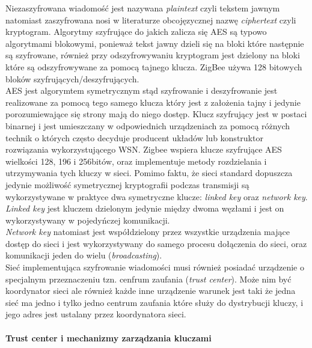 Niezaszyfrowana wiadomość jest nazywana \textit{plaintext} czyli tekstem jawnym natomiast zaszyfrowana nosi w literaturze obcojęzycznej nazwę \textit{ciphertext} czyli kryptogram. Algorytmy szyfrujące do jakich zalicza się AES są typowo algorytmami blokowymi, ponieważ tekst jawny dzieli się na bloki które następnie są szyfrowane, również przy odszyfrowywaniu kryptogram jest dzielony na bloki które są odszyfrowywane za pomocą tajnego klucza. ZigBee używa 128 bitowych bloków szyfrujących/deszyfrujących. \\
AES jest algorymtem symetrycznym stąd szyfrowanie i deszyfrowanie jest realizowane za pomocą tego samego klucza który jest z założenia tajny i jedynie porozumiewające się strony mają do niego dostęp. Klucz szyfrujący jest w postaci binarnej i jest umieszczany w odpowiednich urządzeniach za pomocą różnych technik o których często decyduje producent układów lub konstruktor rozwiązania wykorzystującego WSN.
Zigbee wspiera klucze szyfrujące AES wielkości 128, 196 i 256bitów, oraz implementuje metody rozdzielania i utrzymywania tych kluczy w sieci. Pomimo faktu, że sieci standard dopuszcza jedynie możliwość symetrycznej kryptografii podczas transmisji są wykorzystywane w praktyce dwa symetryczne klucze: \textit{linked key} oraz \textit{network key}. \\
\textit{Linked key} jest kluczem dzielonym jedynie między dwoma węzłami i jest on wykorzystywany w pojedyńczej komunikacji.\\
\textit{Network key} natomiast jest współdzielony przez wszystkie urządzenia mające dostęp do sieci i jest wykorzystywany do samego procesu dołączenia do sieci, oraz komunikacji jeden do wielu (\textit{broadcasting}). \\ 
Sieć implementująca szyfrowanie wiadomości musi również posiadać urządzenie o specjalnym przeznaczeniu tzn. cenfrum zaufania (\textit{trust center}). Może nim być koordynator sieci ale również każde inne urządzenie warunek jest taki że jedna sieć ma jedno i tylko jedno centrum zaufania które służy do dystrybucji kluczy, i jego adres jest ustalany przez koordynatora sieci.

\paragraph{Trust center i mechanizmy zarządzania kluczami} 

